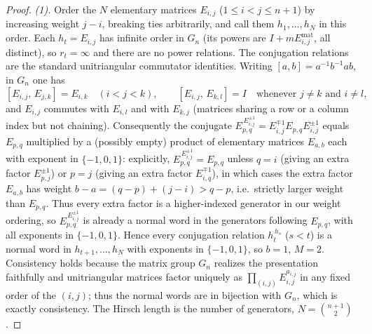 \documentclass{amsart}
\theoremstyle{definition}
\begin{document}
\begin{proof}
\emph{(1).} Order the $N$ elementary matrices $E_{i,j}$ ($1\le i<j\le n+1$) by increasing
weight $j-i$, breaking ties arbitrarily, and call them $h_1,\dots,h_N$ in this order. Each
$h_t=E_{i,j}$ has infinite order in $G_n$ (its powers are $I+m E_{i,j}^{\mathrm{mat}}$, all
distinct), so $r_t=\infty$ and there are no power relations. The conjugation relations are the
standard unitriangular commutator identities. Writing $[a,b]=a^{-1}b^{-1}ab$, in
$G_n$ one has
\[
[E_{i,j},\,E_{j,k}]=E_{i,k}\quad(i<j<k),\qquad
[E_{i,j},\,E_{k,l}]=I\quad\text{whenever }j\ne k\text{ and }i\ne l,
\]
and $E_{i,j}$ commutes with $E_{i,l}$ and with $E_{k,j}$ (matrices sharing a row or a column
index but not chaining). Consequently the conjugate $E_{p,q}^{\,E_{i,j}^{\pm1}}
=E_{i,j}^{\mp1}E_{p,q}E_{i,j}^{\pm1}$ equals $E_{p,q}$ multiplied by a (possibly empty) product
of elementary matrices $E_{a,b}$ each with exponent in $\{-1,0,1\}$: explicitly,
$E_{p,q}^{\,E_{i,j}^{\pm1}}=E_{p,q}$ unless $q=i$ (giving an extra factor $E_{p,j}^{\pm1}$) or
$p=j$ (giving an extra factor $E_{i,q}^{\mp1}$), in which cases the extra factor $E_{a,b}$ has
weight $b-a=(q-p)+(j-i)>q-p$, i.e.\ strictly larger weight than $E_{p,q}$. Thus every extra
factor is a higher-indexed generator in our weight ordering, so $E_{p,q}^{\,E_{i,j}^{\pm1}}$ is
already a normal word in the generators following $E_{p,q}$, with all exponents in
$\{-1,0,1\}$. Hence every conjugation relation $h_t^{\,h_s}$ ($s<t$) is a normal word in
$h_{t+1},\dots,h_N$ with exponents in $\{-1,0,1\}$, so $b=1$, $M=2$. Consistency holds because the matrix group
$G_n$ realizes the presentation faithfully and unitriangular matrices factor uniquely as
$\prod_{(i,j)}E_{i,j}^{a_{i,j}}$ in any fixed order of the $(i,j)$; thus the normal words are
in bijection with $G_n$, which is exactly consistency. The Hirsch length is the number of
generators, $N=\binom{n+1}{2}$.


\end{proof}
\end{document}
